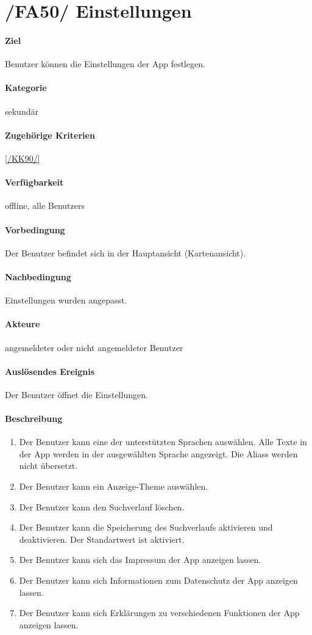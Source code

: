 \section[Einstellungen]{/FA50/ Einstellungen}
\label{/FA50/}
\paragraph{Ziel}
\Gls{Benutzer} können die Einstellungen der App festlegen.
\paragraph{Kategorie}
sekundär
\paragraph{Zugehörige Kriterien}
\ref{/KK90/}
\paragraph{Verfügbarkeit}
\gls{offline}, alle \Glspl{Benutzer}
\paragraph{Vorbedingung}
Der \Gls{Benutzer} befindet sich in der Hauptansicht (\Gls{Kartenansicht}).
\paragraph{Nachbedingung}
Einstellungen wurden angepasst.
\paragraph{Akteure}
angemeldeter oder nicht angemeldeter \Gls{Benutzer}
\paragraph{Auslösendes Ereignis}
Der \Gls{Benutzer} öffnet die Einstellungen.
\paragraph{Beschreibung}
\begin{enumerate}[start=51, label=\textbf{/FA\arabic*/}, align=left]
    \item Der \Gls{Benutzer} kann eine der unterstützten Sprachen auswählen. Alle Texte in der App werden in der ausgewählten Sprache angezeigt. Die \Glspl{Alias} werden nicht übersetzt.
    \item Der \Gls{Benutzer} kann ein Anzeige-\Gls{Theme} auswählen.
    \item Der \Gls{Benutzer} kann den \Gls{Suchverlauf} löschen.
    \item Der \Gls{Benutzer} kann die Speicherung des \Gls{Suchverlauf}s aktivieren und deaktivieren. Der Standartwert ist \dq aktiviert\dq{}.
    \item Der \Gls{Benutzer} kann sich das Impressum der App anzeigen lassen.
    \item Der \Gls{Benutzer} kann sich Informationen zum Datenschutz der App anzeigen lassen.
    \item Der \Gls{Benutzer} kann sich Erklärungen zu verschiedenen Funktionen der App anzeigen lassen.
\end{enumerate}